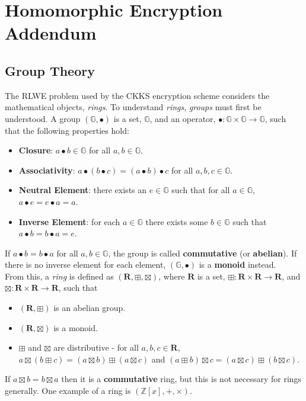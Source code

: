\chapter{Homomorphic Encryption Addendum}

\section{Group Theory}
\label{app:groups}
\setlength{\leftskip}{0.25cm}
\indent \indent
The RLWE problem used by the CKKS encryption scheme considers the mathematical objects, \textit{rings}. To understand \textit{rings}, \textit{groups} must first be understood. A group $(\mathbb{G}, \bullet)$ is a set, $\mathbb{G}$, and an operator, $\bullet: \mathbb{G} \times \mathbb{G} \rightarrow \mathbb{G}$, such that the following properties hold:
\begin{itemize}
    \item \textbf{Closure}: $a \bullet b \in \mathbb{G}$ for all $a,b \in \mathbb{G}$.
    \item \textbf{Associativity}: $a \bullet (b \bullet c) = (a \bullet b) \bullet c$ for all $a, b, c \in \mathbb{G}$.
    \item \textbf{Neutral Element}: there exists an $e \in \mathbb{G}$ such that for all $a \in \mathbb{G}$, $a \bullet e = e \bullet a = a$.
    \item \textbf{Inverse Element}: for each $a \in \mathbb{G}$ there exists some $b \in \mathbb{G}$ such that $a \bullet b = b \bullet a = e$.
\end{itemize}
If $a \bullet b = b \bullet a$ for all $a, b \in \mathbb{G}$, the group is called \textbf{commutative} (or \textbf{abelian}). If there is no inverse element for each element, $(\mathbb{G}, \bullet)$ is a \textbf{monoid} instead.
\bigskip \bigskip \\ \indent
From this, a \textit{ring} is defined as $(\textbf{R}, \boxplus, \boxtimes)$, where $\textbf{R}$ is a set, $\boxplus: \textbf{R} \times \textbf{R} \rightarrow \textbf{R}$, and $\boxtimes: \textbf{R} \times \textbf{R} \rightarrow \textbf{R}$, such that
\begin{itemize}
    \item $(\textbf{R}, \boxplus)$ is an abelian group.
    \item $(\textbf{R}, \boxtimes)$ is a monoid.
    \item $\boxplus$ and $\boxtimes$ are distributive - for all $a, b, c \in \textbf{R}$, $a \boxtimes (b \boxplus c) = (a \boxtimes b) \boxplus (a \boxtimes c)$ and $(a \boxplus b) \boxtimes c = (a \boxtimes c) \boxplus (b \boxtimes c)$.
\end{itemize}
If $a \boxtimes b = b \boxtimes a$ then it is a \textbf{commutative} ring, but this is not necessary for rings generally. One example of a ring is $(\mathbb{Z}[x], +, \times)$.

